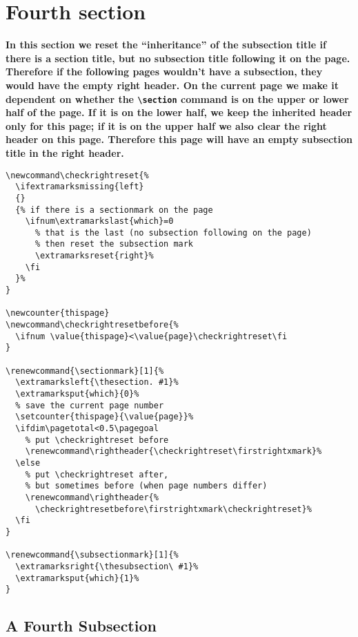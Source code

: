 \documentclass{article}
\newcommand\rightheader{\firstrightxmark}
\renewcommand{\sectionmark}[1]{%
    \extramarksleft{\thesection\ #1}}
\renewcommand{\subsectionmark}[1]{%
    \extramarksright{\thesubsection\ #1}}
\begin{document}
\renewcommand{\subsectionmark}[1]{%
  \extramarksright{\thesubsection\ #1}%
  \extramarksput{which}{1}%
}

\section{Fourth section}
\label{sec:missing}

{\bfseries In this section we reset the ``inheritance'' of the subsection title if there is a section title, but no subsection title following it on the page. Therefore if the following pages wouldn't have a subsection, they would have the empty right header. On the current page we make it dependent on whether the \verb|\section| command is on the upper or lower half of the page. If it is on the lower half, we keep the inherited header only for this page; if it is on the upper half we also clear the right header on this page. Therefore this page will have an empty subsection title in the right header.}

\begin{verbatim}
\newcommand\checkrightreset{%
  \ifextramarksmissing{left}
  {}
  {% if there is a sectionmark on the page
    \ifnum\extramarkslast{which}=0
      % that is the last (no subsection following on the page)
      % then reset the subsection mark
      \extramarksreset{right}%
    \fi
  }%
}

\newcounter{thispage}
\newcommand\checkrightresetbefore{% 
  \ifnum \value{thispage}<\value{page}\checkrightreset\fi
}

\renewcommand{\sectionmark}[1]{%
  \extramarksleft{\thesection. #1}%
  \extramarksput{which}{0}%
  % save the current page number
  \setcounter{thispage}{\value{page}}%
  \ifdim\pagetotal<0.5\pagegoal
    % put \checkrightreset before
    \renewcommand\rightheader{\checkrightreset\firstrightxmark}%
  \else
    % put \checkrightreset after,
    % but sometimes before (when page numbers differ)
    \renewcommand\rightheader{%
      \checkrightresetbefore\firstrightxmark\checkrightreset}%
  \fi
}

\renewcommand{\subsectionmark}[1]{%
  \extramarksright{\thesubsection\ #1}%
  \extramarksput{which}{1}%
}
\end{verbatim}

\medskip

\lipsum[1-3]

\subsection{A Fourth Subsection}
\end{document}
